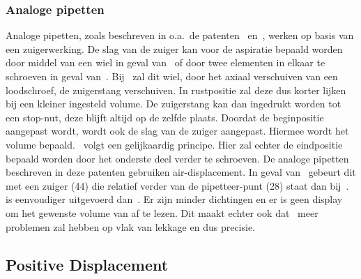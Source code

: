 \subsubsection{Analoge pipetten}
Analoge pipetten, zoals beschreven in o.a.\ de patenten\ \cite{RN16} en\ \cite{RN17}, werken op basis van een zuigerwerking. De slag van de zuiger kan voor de aspiratie bepaald worden door middel van een wiel in geval van\ \cite{RN17} of door twee elementen in elkaar te schroeven in geval van\ \cite{RN16}. Bij\ \cite{RN17} zal dit wiel, door het axiaal verschuiven van een loodschroef, de zuigerstang verschuiven. In rustpositie zal deze dus korter lijken bij een kleiner ingesteld volume. De zuigerstang kan dan ingedrukt worden tot een stop-nut, deze blijft altijd op de zelfde plaats. Doordat de beginpositie aangepast wordt, wordt ook de slag van de zuiger aangepast. Hiermee wordt het volume bepaald.\ \cite{RN16} volgt een gelijkaardig principe. Hier zal echter de eindpositie bepaald worden door het onderste deel verder te schroeven. De analoge pipetten beschreven in deze patenten gebruiken air-displacement. In geval van\ \cite{RN17} gebeurt dit met een zuiger (44) die relatief verder van de pipetteer-punt (28) staat dan bij\ \cite{RN16}.\ \cite{RN16} is eenvoudiger uitgevoerd dan\ \cite{RN17}. Er zijn minder dichtingen en er is geen display om het gewenste volume van af te lezen. Dit maakt echter ook dat\ \cite{RN16} meer problemen zal hebben op vlak van lekkage en dus precisie.

\subsection{Positive Displacement}